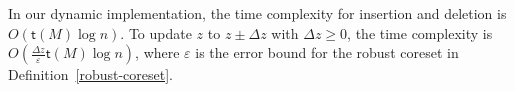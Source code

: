 

\begin{theorem}
\label{the-dynamic}
In our dynamic implementation, the time complexity for insertion and deletion is $O(\mathsf{t}(M)\log n)$. To update $z$ to $z\pm \Delta z$ with $\Delta z\geq 0$, the time complexity is $O(\frac{\Delta z}{\varepsilon}\mathsf{t}(M)\log n)$, where $\varepsilon$ is the error bound for the robust coreset in Definition~\ref{robust-coreset}. 
\end{theorem}















